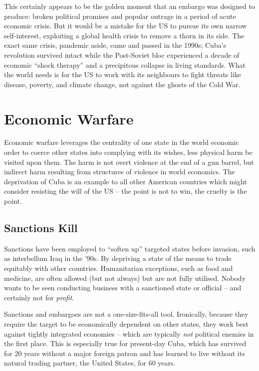 \documentclass[letterpaper,12pt,twoside]{article} %
\begin{document}
\begin{multicols}{2}
This certainly appears to be the golden moment that an embargo was designed to produce: broken political promises and popular outrage in a period of acute economic crisis. But it would be a mistake for the US to pursue its own narrow self-interest, exploiting a global health crisis to remove a thorn in its side. The exact same crisis, pandemic aside, came and passed in the 1990s; Cuba's revolution survived intact while the Post-Soviet bloc experienced a decade of economic ``shock therapy'' and a precipitous collapse in living standards. What the world needs is for the US to work with its neighbours to fight threats like disease, poverty, and climate change, not against the ghosts of the Cold War.

\vfill
\pagebreak
\section{Economic Warfare}

Economic warfare leverages the centrality of one state in the world economic order to coerce other states into complying with its wishes, less physical harm be visited upon them. The harm is not overt violence at the end of a gun barrel, but indirect harm resulting from structures of violence in world economics. The deprivation of Cuba is an example to all other American countries which might consider resisting the will of the US -- the point is not to win, the cruelty is the point.

\subsection*{Sanctions Kill}

Sanctions have been employed to ``soften up'' targeted states before invasion, such as interbellum Iraq in the '90s.\autocite{crossette1995iraq} By depriving a state of the means to trade equitably with other countries. Humanitarian exceptions, such as food and medicine, are often allowed (but not always) but are not fully utilised. Nobody wants to be seen conducting business with a sanctioned state or official -- and certainly not for \textit{profit}.

Sanctions and embargoes are not a one-size-fits-all tool. Ironically, because they require the target to be economically dependent on other states, they work best against tightly integrated economies -- which are typically \textit{not} political enemies in the first place. This is especially true for present-day Cuba, which has survived for 20 years without a major foreign patron and has learned to live without its natural trading partner, the United States, for 60 years.


\end{multicols}
\end{document}
